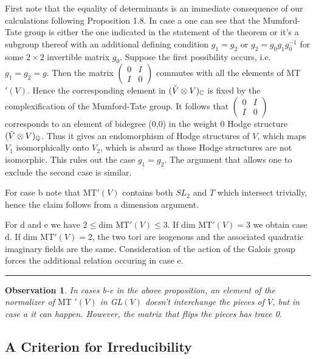 \documentclass[12pt,titlepage]{article}
\newenvironment{proof}{\medskip {\it Proof.\ }}{\ \rule[-0.5mm]{1mm}
          {3.5mm}\medskip\noindent}
\newtheorem{obs}[lem]{Observation}
\begin{document}
\begin{proof} First note that the equality of determinants is an
immediate consequence of our calculations following Proposition 1.8.  
In case a one can see that the Mumford-Tate group
is either the one indicated in the statement of the theorem or it's a
subgroup thereof with an additional defining condition $g_1=g_2$ or
$g_2=g_0g_1g_0^{-1}$ for some $2\times 2$ invertible matrix $g_0$. Suppose
the first possibility occurs, i.e. $g_1=g_2=g$. Then the matrix
$\left(\begin{smallmatrix} 0&I\\I&0 \end{smallmatrix}\right)$ commutes
with all the
elements of MT$'(V)$. Hence the corresponding element in $(\Check{V} 
\otimes
V)_{\mathbb{C}}$ is fixed by the complexification of the Mumford-Tate
group. It follows that $\left(\begin{smallmatrix} 0&I \\ I&0
\end{smallmatrix}\right)$
corresponds to an element of bidegree (0,0) in the weight 0 Hodge
structure $(\Check{V} \otimes V)_\mathbb{Q}$. Thus it gives an
endomorphism of Hodge structures of $V$, which maps $V_1$ isomorphically
onto $V_2$, which is absurd as those Hodge structures are not
isomorphic. This rules out the case $g_1=g_2$. The argument that allows one to
exclude the
second case is similar.

For case b note that MT$'(V)$ contains both $SL_2$ and $T$ which intersect
trivially, hence the claim follows from a dimension argument. 

For d and e we have $2\leq \text{dim MT}'(V) \leq 3$. If dim
MT$'(V)=3$ we obtain case d. If dim MT$'(V)=2$, the two tori are isogenous
and the associated quadratic imaginary fields are the same. Consideration
of the action of the Galois group forces the additional relation occuring
in case e. 
\end{proof}


\begin{obs} \label{almost_never flips}
  In cases b-e in the above proposition, an element of the normalizer of $\text{MT }'(V)$ in GL$(V)$ doesn't interchange the pieces
  of $V$, but in case a it can happen. However, the matrix that flips the pieces has trace 0.
\end{obs}

\subsection{A Criterion for Irreducibility}
\end{document}
